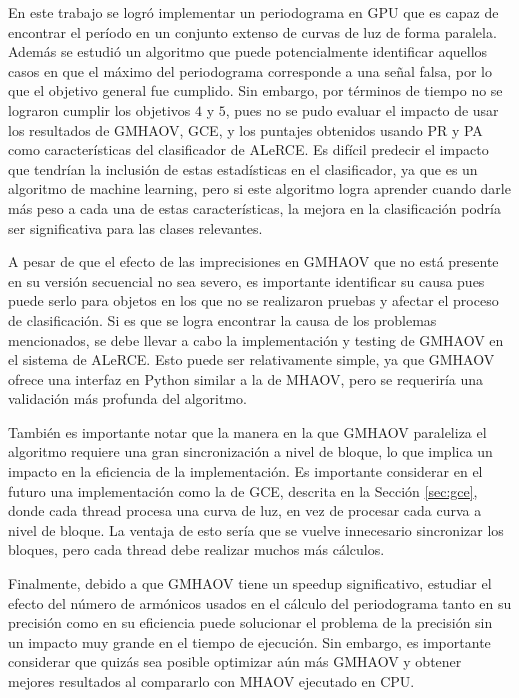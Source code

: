 En este trabajo se logró implementar un periodograma en GPU que es capaz de encontrar el período en un conjunto extenso de curvas de luz de forma paralela. Además se estudió un algoritmo que puede potencialmente identificar aquellos casos en que el máximo del periodograma corresponde a una señal falsa, por lo que el objetivo general fue cumplido. Sin embargo, por términos de tiempo no se lograron cumplir los objetivos $4$ y $5$, pues no se pudo evaluar el impacto de usar los resultados de GMHAOV, GCE, y los puntajes obtenidos usando PR y PA como características del clasificador de ALeRCE. Es difícil predecir el impacto que tendrían la inclusión de estas estadísticas en el clasificador, ya que es un algoritmo de machine learning, pero si este algoritmo logra aprender cuando darle más peso a cada una de estas características, la mejora en la clasificación podría ser significativa para las clases relevantes.

A pesar de que el efecto de las imprecisiones en GMHAOV que no está presente en su versión secuencial no sea severo, es importante identificar su causa pues puede serlo para objetos en los que no se realizaron pruebas y afectar el proceso de clasificación. Si es que se logra encontrar la causa de los problemas mencionados, se debe llevar a cabo la implementación y testing de GMHAOV en el sistema de ALeRCE. Esto puede ser relativamente simple, ya que GMHAOV ofrece una interfaz en Python similar a la de MHAOV, pero se requeriría una validación más profunda del algoritmo.

También es importante notar que la manera en la que GMHAOV paraleliza el algoritmo requiere una gran sincronización a nivel de bloque, lo que implica un impacto en la eficiencia de la implementación. Es importante considerar en el futuro una implementación como la de GCE, descrita en la Sección \ref{sec:gce}, donde cada thread procesa una curva de luz, en vez de procesar cada curva a nivel de bloque. La ventaja de esto sería que se vuelve innecesario sincronizar los bloques, pero cada thread debe realizar muchos más cálculos.

Finalmente, debido a que GMHAOV tiene un speedup significativo, estudiar el efecto del número de armónicos usados en el cálculo del periodograma tanto en su precisión como en su eficiencia puede solucionar el problema de la precisión sin un impacto muy grande en el tiempo de ejecución. Sin embargo, es importante considerar que quizás sea posible optimizar aún más GMHAOV y obtener mejores resultados al compararlo con MHAOV ejecutado en CPU.


